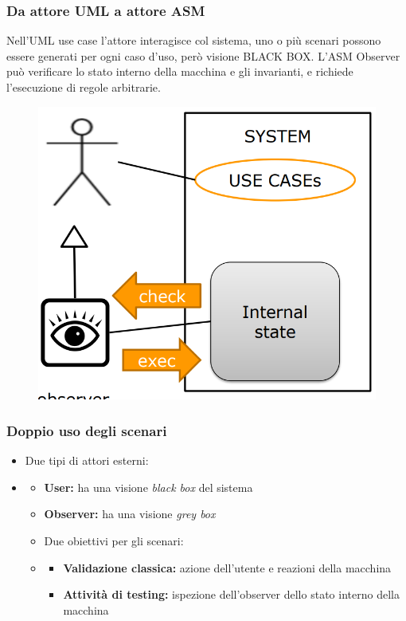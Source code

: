 \subsubsection{Da attore UML  a attore ASM}
\noindent Nell'UML use case l'attore interagisce col sistema, uno o più scenari possono essere generati per
ogni caso d'uso, però visione BLACK BOX.
\noindent L'ASM Observer può verificare lo stato interno della macchina e gli invarianti, e
richiede l'esecuzione di regole arbitrarie.

\begin{figure}[H]
    \includegraphics[width=0.5\linewidth]{chapters/2/images/attoreASM.png}
\end{figure}

\subsubsection{Doppio uso degli scenari}
\begin{itemize}
    \item Due tipi di attori esterni:
    \item \begin{itemize}
        \item \textbf{User:} ha una visione \textit{black box} del sistema
        \item \textbf{Observer:} ha una visione \textit{grey box}
    \item Due obiettivi per gli scenari:
    \item \begin{itemize}
        \item \textbf{Validazione classica:} azione dell'utente e reazioni della macchina
        \item \textbf{Attività di testing:} ispezione dell’observer dello stato interno
        della macchina
    \end{itemize}
    \end{itemize}
\end{itemize}

